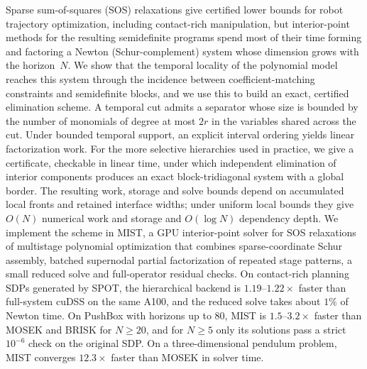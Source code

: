 Sparse sum-of-squares (SOS) relaxations give certified lower bounds for robot
trajectory optimization, including contact-rich manipulation, but interior-point
methods for the resulting
semidefinite programs spend most of their time forming and factoring a Newton
(Schur-complement) system whose dimension grows with the horizon~$N$. We show
that the temporal locality of the polynomial model reaches this system through
the incidence between coefficient-matching constraints and semidefinite blocks,
and we use this to build an exact, certified elimination scheme. A temporal cut
admits a separator whose size is bounded by the number of monomials of degree at
most $2r$ in the variables shared across the cut. Under bounded temporal support,
an explicit interval ordering yields linear factorization work. For the more
selective hierarchies used in practice, we give a certificate, checkable in
linear time, under which independent elimination of interior components produces
an exact block-tridiagonal system with a global border. The resulting work,
storage and solve bounds depend on accumulated local fronts and retained
interface widths; under uniform local bounds they give $O(N)$ numerical work and
storage and $O(\log N)$ dependency depth. We implement the scheme in MIST, a GPU
interior-point solver for SOS relaxations of multistage polynomial optimization
that combines sparse-coordinate Schur assembly, batched
supernodal partial factorization of repeated stage patterns, a small reduced
solve and full-operator residual checks. On contact-rich planning SDPs generated
by SPOT, the hierarchical backend is $1.19$--$1.22\times$ faster than
full-system cuDSS on the same A100, and the reduced solve takes about $1\%$ of
Newton time. On PushBox with horizons up to $80$, MIST is $1.5$--$3.2\times$
faster than MOSEK and BRISK for $N\ge20$, and for $N\ge5$ only its solutions
pass a strict $10^{-6}$ check on the original SDP. On a three-dimensional
pendulum problem, MIST converges $12.3\times$ faster than MOSEK
in solver time.
